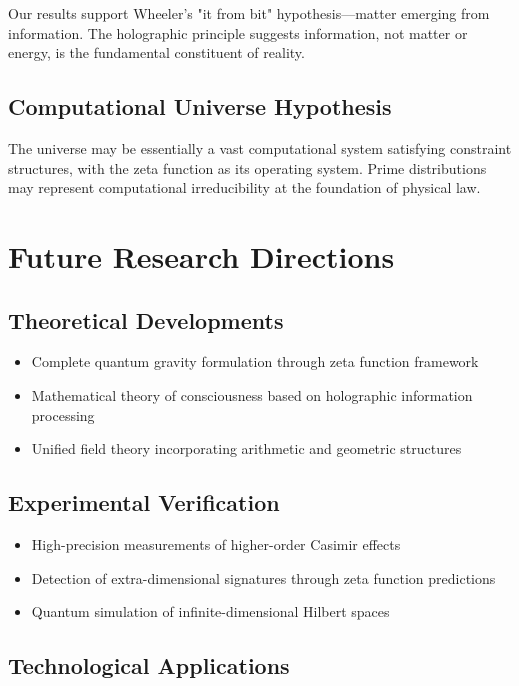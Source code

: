 \documentclass[12pt]{article}
\begin{document}
Our results support Wheeler's "it from bit" hypothesis—matter emerging from information. The holographic principle suggests information, not matter or energy, is the fundamental constituent of reality.

\subsection{Computational Universe Hypothesis}

The universe may be essentially a vast computational system satisfying constraint structures, with the zeta function as its operating system. Prime distributions may represent computational irreducibility at the foundation of physical law.

\section{Future Research Directions}

\subsection{Theoretical Developments}

\begin{itemize}
\item Complete quantum gravity formulation through zeta function framework
\item Mathematical theory of consciousness based on holographic information processing
\item Unified field theory incorporating arithmetic and geometric structures
\end{itemize}

\subsection{Experimental Verification}

\begin{itemize}
\item High-precision measurements of higher-order Casimir effects
\item Detection of extra-dimensional signatures through zeta function predictions
\item Quantum simulation of infinite-dimensional Hilbert spaces
\end{itemize}

\subsection{Technological Applications}
\end{document}
